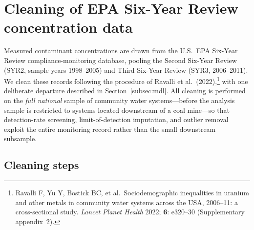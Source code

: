 
\section{Cleaning of EPA Six-Year Review concentration data}
\label{sec:6yr_cleaning}

Measured contaminant concentrations are drawn from the U.S.\ EPA Six-Year
Review compliance-monitoring database, pooling the Second Six-Year Review
(SYR2, sample years 1998--2005) and Third Six-Year Review (SYR3, 2006--2011).
We clean these records following the procedure of Ravalli et al.\
(2022),\footnote{Ravalli F, Yu Y, Bostick BC, et al.\ Sociodemographic
inequalities in uranium and other metals in community water systems across the
USA, 2006--11: a cross-sectional study. \emph{Lancet Planet Health} 2022;
\textbf{6}: e320--30 (Supplementary appendix~2).} with one deliberate
departure described in Section~\ref{subsec:mdl}. All cleaning is performed on
the \emph{full national} sample of community water systems---before the analysis
sample is restricted to systems located downstream of a coal mine---so that
detection-rate screening, limit-of-detection imputation, and outlier removal
exploit the entire monitoring record rather than the small downstream subsample.

\subsection{Cleaning steps}

